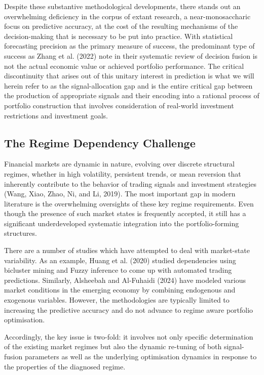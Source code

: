\documentclass{singlecol-new}
\theoremstyle{TH}{
\newtheorem{lemma}{Lemma}
\newtheorem{theorem}[lemma]{Theorem}
\newtheorem{corrolary}[lemma]{Corrolary}
\newtheorem{conjecture}[lemma]{Conjecture}
\newtheorem{proposition}[lemma]{Proposition}
\newtheorem{claim}[lemma]{Claim}
\newtheorem{stheorem}[lemma]{Wrong Theorem}
\newtheorem{algorithm}{Algorithm}
}
\theoremstyle{THrm}{
\newtheorem{definition}{Definition}[section]
\newtheorem{question}{Question}[section]
\newtheorem{remark}{Remark}
\newtheorem{scheme}{Scheme}
}
\theoremstyle{THhit}{
\newtheorem{case}{Case}[section]
}
\begin{document}
Despite these substantive methodological developments, there stands out an overwhelming deficiency in the corpus of extant research, a near-monosaccharic focus on predictive accuracy, at the cost of the resulting mechanisms of the decision-making that is necessary to be put into practice. With statistical forecasting precision as the primary measure of success, the predominant type of success as Zhang et al. (2022) note in their systematic review of decision fusion is not the actual economic value or achieved portfolio performance. The critical discontinuity that arises out of this unitary interest in prediction is what we will herein refer to as the signal-allocation gap and is the entire critical gap between the production of appropriate signals and their encoding into a rational process of portfolio construction that involves consideration of real-world investment restrictions and investment goals.


\subsection{The Regime Dependency Challenge}
Financial markets are dynamic in nature, evolving over discrete structural regimes, whether in high volatility, persistent trends, or mean reversion that inherently contribute to the behavior of trading signals and investment strategies (Wang, Xiao, Zhao, Ni, and Li, 2019). The most important gap in modern literature is the overwhelming oversights of these key regime requirements. Even though the presence of such market states is frequently accepted, it still has a significant underdeveloped systematic integration into the portfolio-forming structures.  

There are a number of studies which have attempted to deal with market-state variability. As an example, Huang et al. (2020) studied dependencies using bicluster mining and Fuzzy inference to come up with automated trading predictions. Similarly, Alsheebah and Al‑Fuhaidi (2024) have modeled various market conditions in the emerging economy by combining endogenous and exogenous variables. However, the methodologies are typically limited to increasing the predictive accuracy and do not advance to regime aware portfolio optimisation.  

Accordingly, the key issue is two-fold: it involves not only specific determination of the existing market regimes but also the dynamic re-tuning of both signal-fusion parameters as well as the underlying optimisation dynamics in response to the properties of the diagnosed regime.
\end{document}
